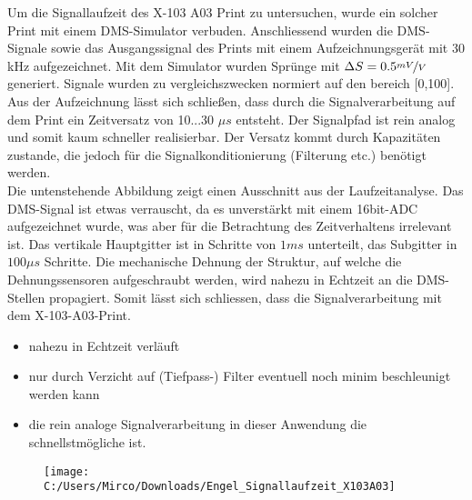 \documentclass[10pt,a4paper]{article}
\author{Mirco Huber}
\begin{document}
\noindent
Um die Signallaufzeit des X-103 A03 Print zu untersuchen, wurde ein solcher Print mit einem DMS-Simulator verbuden. Anschliessend wurden die DMS-Signale sowie das Ausgangssignal des Prints mit einem Aufzeichnungsgerät mit 30 kHz aufgezeichnet. Mit dem Simulator wurden Sprünge mit $\Delta S = 0.5 \nicefrac{mV}{V}$ generiert. Signale wurden zu vergleichszwecken normiert auf den bereich [0,100]. \\\newline
\noindent Aus der Aufzeichnung lässt sich schließen, dass durch die Signalverarbeitung auf dem Print ein Zeitversatz von 10...30 $\mu s$ entsteht. Der Signalpfad ist rein analog und somit kaum schneller realisierbar. Der Versatz kommt durch Kapazitäten zustande, die jedoch für die Signalkonditionierung (Filterung etc.) benötigt werden. \\\newline
Die untenstehende Abbildung zeigt einen Ausschnitt aus der Laufzeitanalyse. Das DMS-Signal ist etwas verrauscht, da es unverstärkt mit einem 16bit-ADC aufgezeichnet wurde, was aber für die Betrachtung des Zeitverhaltens irrelevant ist. Das vertikale Hauptgitter ist in Schritte von $1 ms$ unterteilt, das Subgitter in $100\mu s$ Schritte.
\noindent Die mechanische Dehnung der Struktur, auf welche die Dehnungssensoren aufgeschraubt werden, wird nahezu in Echtzeit an die DMS-Stellen propagiert. Somit lässt sich schliessen, dass die Signalverarbeitung mit dem X-103-A03-Print.
\begin{itemize}
	\item nahezu in Echtzeit verläuft
	\item nur durch Verzicht auf (Tiefpass-) Filter eventuell noch minim beschleunigt werden kann
	\item die rein analoge Signalverarbeitung in dieser Anwendung die schnellstmögliche ist.
\end{itemize}

\begin{figure}[H]
	\centering
	\texttt{[image: C:/Users/Mirco/Downloads/Engel\_Signallaufzeit\_X103A03]}
	\label{fig:engelsignallaufzeitx103a03}
\end{figure}
\end{document}

